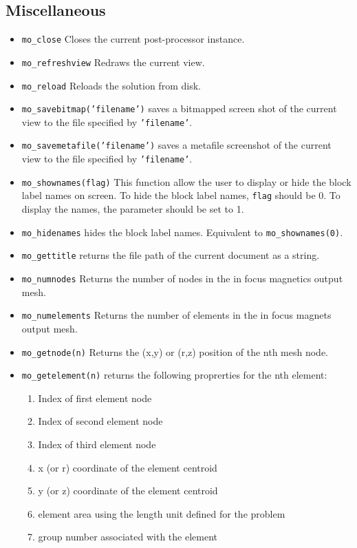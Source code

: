 \subsection{Miscellaneous}
\begin{itemize}

\item{\tt mo\_close} Closes the current post-processor instance.
\item{\tt mo\_refreshview} Redraws the current view.
\item{\tt mo\_reload} Reloads the solution from disk.
\item{\tt mo\_savebitmap('filename')} saves a bitmapped screen shot of the current
view to the file specified by {\tt 'filename'}.
\item{\tt mo\_savemetafile('filename')} saves a metafile screenshot of the current
view to the file specified by {\tt 'filename'}.
\item{\tt mo\_shownames(flag)} This function allow the user to display or hide the block label
names on screen.  To hide the block label names, {\tt flag} should be 0.  To display the
names, the parameter should be set to 1.

\item{\tt mo\_hidenames} hides the block label names. Equivalent to {\tt mo\_shownames(0)}.

\item{\tt mo\_gettitle} returns the file path of the current document as a string.

\item{\tt mo\_numnodes} Returns the number of nodes in the in focus magnetics output mesh.
\item{\tt mo\_numelements} Returns the number of elements in the in focus magnets output mesh.
\item{\tt mo\_getnode(n)} Returns the (x,y) or (r,z) position of the nth mesh node.
\item{\tt mo\_getelement(n)} returns the following proprerties for the nth element: 
	\begin{enumerate}
	    \item Index of first element node
   		\item Index of second element node
   	 	\item Index of third element node
    	\item x (or r) coordinate of the element centroid
    	\item y (or z) coordinate of the element centroid
    	\item element area using the length unit defined for the problem
    	\item group number associated with the element
	\end{enumerate}



\end{itemize}
